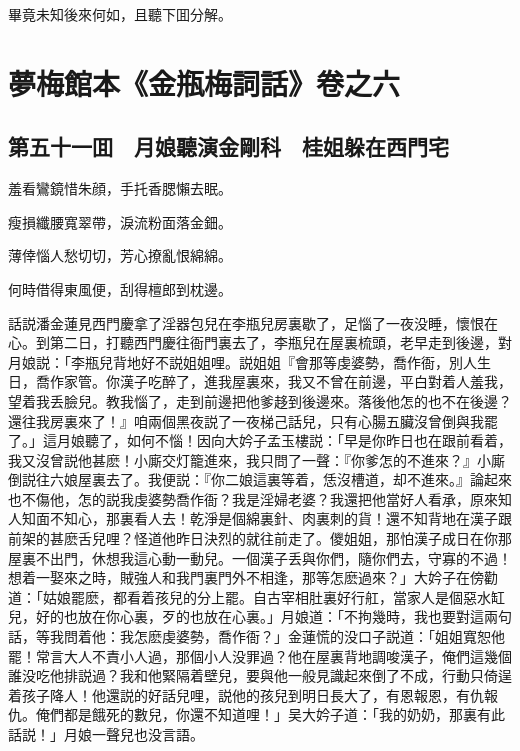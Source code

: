 畢竟未知後來何如，且聽下囬分解。

\part*{夢梅館本《金瓶梅詞話》卷之六}

\chapter*{第五十一囬　月娘聽演金剛科　桂姐躲在西門宅}

羞看鸞鏡惜朱顔，手托香腮懶去眠。

瘦損纖腰寬翠帶，淚流粉面落金鈿。

薄倖惱人愁切切，芳心撩亂恨綿綿。

何時借得東風便，刮得檀郎到枕邊。

話説潘金蓮見西門慶拿了淫器包兒在李瓶兒房裏歇了，足惱了一夜没睡，懷恨在心。到第二日，打聽西門慶往衙門裏去了，李瓶兒在屋裏梳頭，老早走到後邊，對月娘説：「李瓶兒背地好不説姐姐哩。説姐姐『會那等虔婆勢，喬作衙，別人生日，喬作家管。你漢子吃醉了，進我屋裏來，我又不曾在前邊，平白對着人羞我，望着我丢臉兒。教我惱了，走到前邊把他爹趍到後邊來。落後他怎的也不在後邊？還往我房裏來了！』咱兩個黑夜説了一夜梯己話兒，只有心腸五臟沒曾倒與我罷了。」這月娘聽了，如何不惱！因向大妗子孟玉樓説：「早是你昨日也在跟前看着，我又沒曾説他甚麽！小廝交灯籠進來，我只問了一聲：『你爹怎的不進來？』小廝倒説往六娘屋裏去了。我便説：『你二娘這裏等着，恁沒槽道，却不進來。』論起來也不傷他，怎的説我虔婆勢喬作衙？我是淫婦老婆？我還把他當好人看承，原來知人知面不知心，那裏看人去！乾淨是個綿裏針、肉裏刺的貨！還不知背地在漢子跟前架的甚麽舌兒哩？怪道他昨日決烈的就往前走了。儍姐姐，那怕漢子成日在你那屋裏不出門，休想我這心動一動兒。一個漢子丢與你們，隨你們去，守寡的不過！想着一娶來之時，賊強人和我門裏門外不相逢，那等怎麽過來？」大妗子在傍勸道：「姑娘罷麽，都看着孩兒的分上罷。自古宰相肚裏好行舡，當家人是個惡水缸兒，好的也放在你心裏，歹的也放在心裏。」月娘道：「不拘幾時，我也要對這兩句話，等我問着他：我怎麽虔婆勢，喬作衙？」金蓮慌的没口子説道：「姐姐寬恕他罷！常言大人不責小人過，那個小人没罪過？他在屋裏背地調唆漢子，俺們這幾個誰没吃他排説過？我和他緊隔着壁兒，要與他一般見識起來倒了不成，行動只倚逞着孩子降人！他還説的好話兒哩，説他的孩兒到明日長大了，有恩報恩，有仇報仇。俺們都是餓死的數兒，你還不知道哩！」吴大妗子道：「我的奶奶，那裏有此話説！」月娘一聲兒也没言語。

